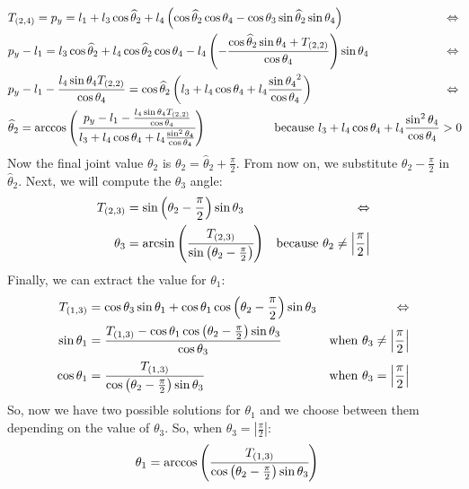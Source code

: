 \begin{align*}
&T_{(2,4)} = p_y = l_1 + l_3\cos\widehat{\theta}_2 + l_4\left(\cos\widehat{\theta}_2\cos\theta_4 - \cos\theta_3\sin\widehat{\theta}_2\sin\theta_4\right)&\Leftrightarrow\\
&p_y - l_1 =l_3\cos\widehat{\theta}_2 + l_4\cos\widehat{\theta}_2\cos\theta_4 - l_4\left(-\frac{\cos\widehat{\theta}_2\sin\theta_4 + T_{(2,2)}}{\cos\theta_4}\right)\sin\theta_4&\Leftrightarrow\\
&p_y - l_1 - \frac{l_4\sin\theta_4 T_{(2,2)}}{\cos\theta_4} = \cos\widehat{\theta}_2\left(l_3 + l_4\cos\theta_4 + l_4\frac{{\sin\theta_4}^2}{\cos\theta_4}\right)&\Leftrightarrow\\
&\widehat{\theta}_2 = \arccos\left(\cfrac{p_y - l_1 - \frac{l_4\sin\theta_4 T_{(2,2)}}{\cos\theta_4}}{l_3 + l_4\cos\theta_4 + l_4\frac{\sin^2\theta_4}{\cos\theta_4}}\right) \hspace{2cm} \text{because }   l_3 + l_4\cos\theta_4 + l_4\frac{\sin^2\theta_4}{\cos\theta_4}>0 \hspace{-0.8cm}
\end{align*}
Now the final joint value $\theta_2$ is $\theta_2 = \widehat{\theta}_2 + \frac{\pi}{2}$. From now on, we substitute $\theta_2 - \frac{\pi}{2}$ in $\widehat{\theta}_2$.
Next, we will compute the $\theta_3$ angle:
\begin{align*}
T_{(2,3)} &= \sin\left(\theta_2 - \frac{\pi}{2}\right)\sin\theta_3 &\Leftrightarrow \\
 \theta_3 &= \arcsin\left( \cfrac{ T_{(2,3)} }{ \sin\left(\theta_2-\frac{\pi}{2}\right)}\right)  &\text{because }    \theta_2 \neq \left|\frac{\pi}{2}\right|
\end{align*}
Finally, we can extract the value for $\theta_1$:
\begin{align*}
T_{(1,3)} &= \cos\theta_3\sin\theta_1 + \cos\theta_1\cos\left(\theta_2 - \frac{\pi}{2}\right)\sin\theta_3 &\Leftrightarrow \\
\sin\theta_1 &= \cfrac{T_{(1,3)} - \cos\theta_1\cos\left(\theta_2 - \frac{\pi}{2}\right)\sin\theta_3}{\cos\theta_3}  &\text{when } \theta_3 \neq \left|\frac{\pi}{2}\right|\\
\cos\theta_1 &= \cfrac{T_{(1,3)}}{\cos\left(\theta_2 - \frac{\pi}{2}\right)\sin\theta_3}  &\text{when } \theta_3 = \left|\frac{\pi}{2}\right|
\end{align*}
So, now we have two possible solutions for $\theta_1$ and we choose between them depending on the value of $\theta_3$. So, when $\theta_3 = \left|\frac{\pi}{2}\right|$:
\begin{align*}
&\theta_1 = \arccos\left(\cfrac{T_{(1,3)}}{\cos\left(\theta_2 - \frac{\pi}{2}\right)\sin\theta_3}\right)
\end{align*}
